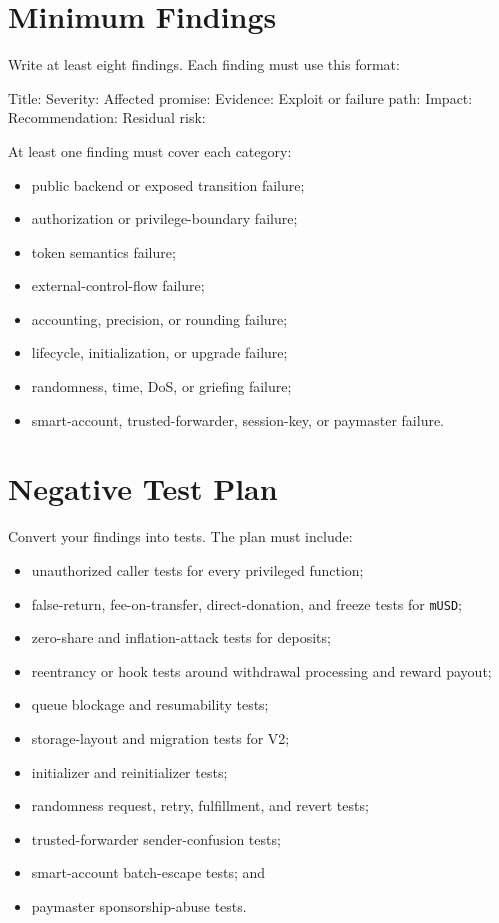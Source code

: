 \section*{Minimum Findings}

Write at least eight findings. Each finding must use this format:

\begin{codeblock}
Title:
Severity:
Affected promise:
Evidence:
Exploit or failure path:
Impact:
Recommendation:
Residual risk:
\end{codeblock}

At least one finding must cover each category:

\begin{itemize}
\item public backend or exposed transition failure;
\item authorization or privilege-boundary failure;
\item token semantics failure;
\item external-control-flow failure;
\item accounting, precision, or rounding failure;
\item lifecycle, initialization, or upgrade failure;
\item randomness, time, DoS, or griefing failure;
\item smart-account, trusted-forwarder, session-key, or paymaster failure.
\end{itemize}

\section*{Negative Test Plan}

Convert your findings into tests. The plan must include:

\begin{itemize}
\item unauthorized caller tests for every privileged function;
\item false-return, fee-on-transfer, direct-donation, and freeze tests for \texttt{mUSD};
\item zero-share and inflation-attack tests for deposits;
\item reentrancy or hook tests around withdrawal processing and reward payout;
\item queue blockage and resumability tests;
\item storage-layout and migration tests for V2;
\item initializer and reinitializer tests;
\item randomness request, retry, fulfillment, and revert tests;
\item trusted-forwarder sender-confusion tests;
\item smart-account batch-escape tests; and
\item paymaster sponsorship-abuse tests.
\end{itemize}

